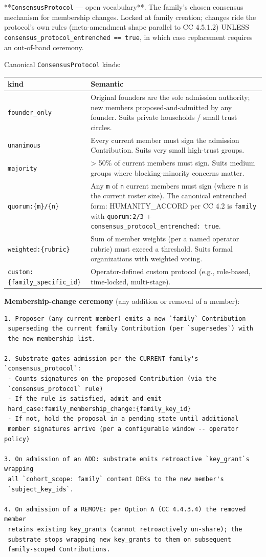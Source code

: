 \documentclass[11pt]{article}
\begin{document}
**\texttt{ConsensusProtocol} — open vocabulary**. The family's chosen consensus mechanism for membership changes. Locked at family creation; changes ride the protocol's own rules (meta-amendment shape parallel to CC 4.5.1.2) UNLESS \texttt{consensus\_protocol\_entrenched == true}, in which case replacement requires an out-of-band ceremony.


Canonical \texttt{ConsensusProtocol} kinds:


{\footnotesize
\begin{longtable}{|p{8.0cm}|p{8.0cm}|}\hline
\textbf{kind} & \textbf{Semantic} \\ \hline\endhead
\texttt{founder\_only} & Original founders are the sole admission authority; new members proposed-and-admitted by any founder. Suits private households / small trust circles. \\ \hline
\texttt{unanimous} & Every current member must sign the admission Contribution. Suits very small high-trust groups. \\ \hline
\texttt{majority} & > 50\% of current members must sign. Suits medium groups where blocking-minority concerns matter. \\ \hline
\texttt{quorum:\{m\}/\{n\}} & Any \texttt{m} of \texttt{n} current members must sign (where \texttt{n} is the current roster size). The canonical entrenched form: HUMANITY\_ACCORD per CC 4.2 is \texttt{family} with \texttt{quorum:2/3} + \texttt{consensus\_protocol\_entrenched: true}. \\ \hline
\texttt{weighted:\{rubric\}} & Sum of member weights (per a named operator rubric) must exceed a threshold. Suits formal organizations with weighted voting. \\ \hline
\texttt{custom:\{family\_specific\_id\}} & Operator-defined custom protocol (e.g., role-based, time-locked, multi-stage). \\ \hline
\end{longtable}}


\textbf{Membership-change ceremony} (any addition or removal of a member):


\begin{lstlisting}
1. Proposer (any current member) emits a new `family` Contribution
 superseding the current family Contribution (per `supersedes`) with
 the new membership list.

2. Substrate gates admission per the CURRENT family's `consensus_protocol`:
 - Counts signatures on the proposed Contribution (via the
 `consensus_protocol` rule)
 - If the rule is satisfied, admit and emit
 hard_case:family_membership_change:{family_key_id}
 - If not, hold the proposal in a pending state until additional
 member signatures arrive (per a configurable window -- operator policy)

3. On admission of an ADD: substrate emits retroactive `key_grant`s wrapping
 all `cohort_scope: family` content DEKs to the new member's
 `subject_key_ids`.

4. On admission of a REMOVE: per Option A (CC 4.4.3.4) the removed member
 retains existing key_grants (cannot retroactively un-share); the
 substrate stops wrapping new key_grants to them on subsequent
 family-scoped Contributions.
\end{lstlisting}
\end{document}
